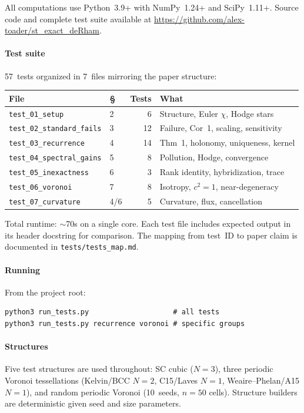 \documentclass[12pt]{article}
\theoremstyle{definition}
\theoremstyle{remark}
\begin{document}
All computations use Python~3.9+ with NumPy~1.24+ and SciPy~1.11+. Source code
and complete test suite available at
\url{https://github.com/alex-toader/st_exact_deRham}.

\paragraph{Test suite} 57~tests organized in 7~files mirroring the paper
structure:

\begin{table}[h]
\centering\small
\begin{tabular}{llrl}
\toprule
File & \S & Tests & What \\
\midrule
\texttt{test\_01\_setup}           & 2   & 6  & Structure, Euler $\chi$, Hodge stars \\
\texttt{test\_02\_standard\_fails} & 3   & 12 & Failure, Cor~1, scaling, sensitivity \\
\texttt{test\_03\_recurrence}      & 4   & 14 & Thm~1, holonomy, uniqueness, kernel \\
\texttt{test\_04\_spectral\_gains} & 5   & 8  & Pollution, Hodge, convergence \\
\texttt{test\_05\_inexactness}     & 6   & 3  & Rank identity, hybridization, trace \\
\texttt{test\_06\_voronoi}         & 7   & 8  & Isotropy, $c^2{=}1$, near-degeneracy \\
\texttt{test\_07\_curvature}       & 4/6 & 5  & Curvature, flux, cancellation \\
\bottomrule
\end{tabular}
\end{table}

Total runtime: $\sim$70s on a single core. Each test file includes expected
output in its header docstring for comparison. The mapping from test~ID to
paper claim is documented in \texttt{tests/tests\_map.md}.

\paragraph{Running} From the project root:
\begin{verbatim}
python3 run_tests.py                    # all tests
python3 run_tests.py recurrence voronoi # specific groups
\end{verbatim}

\paragraph{Structures} Five test structures are used throughout: SC cubic
($N{=}3$), three periodic Voronoi tessellations (Kelvin/BCC $N{=}2$,
C15/Laves $N{=}1$, Weaire--Phelan/A15 $N{=}1$), and random periodic Voronoi
(10~seeds, $n{=}50$ cells). Structure builders are deterministic given seed
and size parameters.
\end{document}
